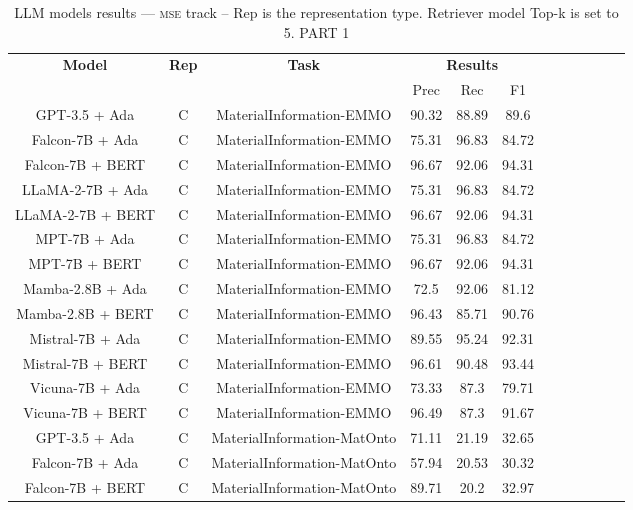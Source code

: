\begin{table}
        \centering
        \small
        \caption{LLM models results --- \textsc{mse} track -- Rep is the representation type. Retriever model Top-k is set to 5. PART 1 } \label{tab:llm_mse1}
        \begin{tabular}{|c|c|c|c|c|c|c|c|c|c|c|c|}
            \hline
             \multirow{2}{*}{\textbf{Model}}  & \multirow{2}{*}{\textbf{Rep}}  & \multirow{2}{*}{\textbf{Task}} &  \multicolumn{3}{c|}{\textbf{Results}} \\
             \cline{4-6}
              & & & Prec & Rec & F1  \\
            \hline
	GPT-3.5 + Ada  & C & MaterialInformation-EMMO  &  90.32 &  88.89 & 89.6  \\
	Falcon-7B + Ada  & C & MaterialInformation-EMMO  &  75.31 &  96.83 & 84.72  \\
	Falcon-7B + BERT  & C & MaterialInformation-EMMO  &  96.67 &  92.06 & 94.31  \\
	LLaMA-2-7B + Ada  & C & MaterialInformation-EMMO  &  75.31 &  96.83 & 84.72  \\
	LLaMA-2-7B + BERT  & C & MaterialInformation-EMMO  &  96.67 &  92.06 & 94.31  \\
	MPT-7B + Ada  & C & MaterialInformation-EMMO  &  75.31 &  96.83 & 84.72  \\
	MPT-7B + BERT  & C & MaterialInformation-EMMO  &  96.67 &  92.06 & 94.31  \\
	Mamba-2.8B + Ada  & C & MaterialInformation-EMMO  &  72.5 &  92.06 & 81.12  \\
	Mamba-2.8B + BERT  & C & MaterialInformation-EMMO  &  96.43 &  85.71 & 90.76  \\
	Mistral-7B + Ada  & C & MaterialInformation-EMMO  &  89.55 &  95.24 & 92.31  \\
	Mistral-7B + BERT  & C & MaterialInformation-EMMO  &  96.61 &  90.48 & 93.44  \\
	Vicuna-7B + Ada  & C & MaterialInformation-EMMO  &  73.33 &  87.3 & 79.71  \\
	Vicuna-7B + BERT  & C & MaterialInformation-EMMO  &  96.49 &  87.3 & 91.67  \\
	\hline
	GPT-3.5 + Ada  & C & MaterialInformation-MatOnto  &  71.11 &  21.19 & 32.65  \\
	Falcon-7B + Ada  & C & MaterialInformation-MatOnto  &  57.94 &  20.53 & 30.32  \\
	Falcon-7B + BERT  & C & MaterialInformation-MatOnto  &  89.71 &  20.2 & 32.97  \\

\end{tabular}
\end{table}
